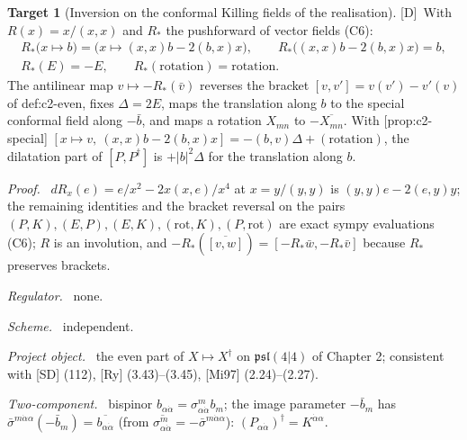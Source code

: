 \documentclass[11pt]{article}
\theoremstyle{definition}
\newtheorem{target}{Target}
\newcommand{\Dl}{\textup{[D]}}
\newcommand{\fld}[1]{\par\textit{#1.}\ }
\begin{document}
\begin{target}[Inversion on the conformal Killing fields of the realisation]\label{t:inv}
\Dl\ With $R(x)=x/(x,x)$ and $R_*$ the pushforward of vector fields (C6):
\[
\begin{gathered}
R_*\big(x\mapsto b\big)=\big(x\mapsto(x,x)b-2(b,x)x\big),\qquad R_*\big((x,x)b-2(b,x)x\big)=b,\\
R_*(E)=-E,\qquad R_*(\text{rotation})=\text{rotation}.
\end{gathered}
\]
The antilinear map $v\mapsto-R_*(\bar v)$ reverses the bracket $[v,v']=v(v')-v'(v)$ of def:c2-even, fixes $\Delta=2E$, maps the translation along $b$ to the special conformal field along $-\bar b$, and maps a rotation $X_{mn}$ to $-\overline{X_{mn}}$. With [prop:c2-special] $[x\mapsto v,\ (x,x)b-2(b,x)x]=-(b,v)\Delta+(\text{rotation})$, the dilatation part of $[P,P^\dagger]$ is $+|b|^2\Delta$ for the translation along $b$.
\fld{Proof} $dR_x(e)=e/x^2-2x(x,e)/x^4$ at $x=y/(y,y)$ is $(y,y)e-2(e,y)y$; the remaining identities and the bracket reversal on the pairs $(P,K),(E,P),(E,K),(\text{rot},K),(P,\text{rot})$ are exact sympy evaluations (C6); $R$ is an involution, and $-R_*(\overline{[v,w]})=[-R_*\bar w,-R_*\bar v]$ because $R_*$ preserves brackets.
\fld{Regulator} none. \fld{Scheme} independent.
\fld{Project object} the even part of $X\mapsto X^\dagger$ on $\mathfrak{psl}(4|4)$ of Chapter 2; consistent with [SD] (112), [Ry] (3.43)--(3.45), [Mi97] (2.24)--(2.27).
\fld{Two-component} bispinor $b_{\alpha\dot\alpha}=\sigma^m_{\alpha\dot\alpha}b_m$; the image parameter $-\bar b_m$ has $\bar\sigma^{m\dot\alpha\alpha}(-\bar b_m)=\overline{b_{\alpha\dot\alpha}}$ (from $\overline{\sigma^m_{\alpha\dot\alpha}}=-\bar\sigma^{m\dot\alpha\alpha}$): $(P_{\alpha\dot\alpha})^\dagger=K^{\dot\alpha\alpha}$.
\end{target}
\end{document}
